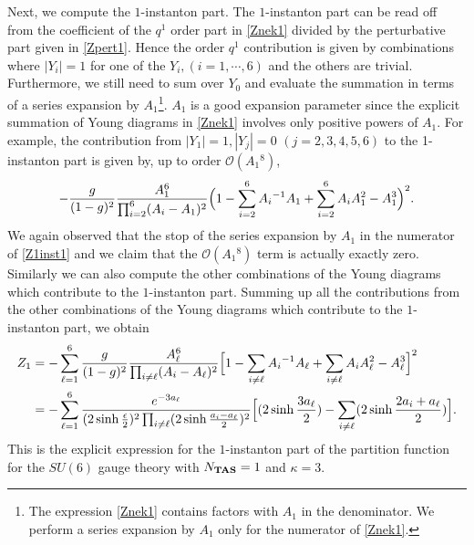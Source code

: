 \documentclass[11pt,a4paper]{article}
\newcommand{\nn}{\nonumber}
\begin{document}
Next, we compute the $1$-instanton part. The $1$-instanton part can be read off from the coefficient of the $q^1$ order part in \eqref{Znek1} divided by the perturbative part given in \eqref{Zpert1}.
Hence the order $q^1$ contribution is given by combinations where $|Y_i| = 1$ for one of the $Y_i, (i=1, \cdots, 6)$ and the others are trivial. Furthermore, we still need to sum over $Y_0$ and evaluate the summation in terms of a series expansion by $A_1$\footnote{The expression \eqref{Znek1} contains factors with $A_1$ in the denominator. We perform a series expansion by $A_1$ only for the numerator of \eqref{Znek1}. }. $A_1$ is a good expansion parameter since the explicit summation of Young diagrams in \eqref{Znek1} involves only positive powers of $A_1$. For example, the contribution from $|Y_1| = 1 , |Y_j| = 0 \,\, (j=2,3,4,5,6)$ to the 1-instanton part is given by, up to order $\mathcal{O} (A_1{}^8)$,
\begin{align}
 - \frac{g}{(1-g)^2} \frac{A_1^6}{\prod_{i= 2}^6 (A_i - A_1)^2} 
 \Bigl(
1 - \sum_{i = 2}^6  A_i{}^{-1} A_1 + \sum_{i = 2}^6  A_i A_1^2 - A_1^3
\Bigr)^2. \label{Z1inst1}
\end{align} 
We again observed that the stop of the series expansion by $A_1$ in the numerator of \eqref{Z1inst1} and we claim that the $\mathcal{O} (A_1{}^8)$ term is actually exactly zero. 
Similarly we can also compute the other combinations of the Young diagrams which contribute to the $1$-instanton part. Summing up all the contributions from the other combinations of the Young diagrams which contribute to the $1$-instanton part, we obtain
\begin{align}
Z_{1} 
&= - \sum_{\ell=1}^6
\frac{g}{(1-g)^2} \frac{A_\ell^6}{\prod_{i \neq \ell} (A_i - A_\ell)^2} 
\Bigl[
1 - \sum_{i \neq \ell}  A_i{}^{-1} A_\ell + \sum_{i \neq \ell}  A_i A_\ell^2 - A_\ell^3
\Bigr]^2
\nn\\
&= - \sum_{\ell=1}^6
\frac{e^{-3a_\ell}}{(2 \sinh \frac{\epsilon}{2} )^2\prod_{i \neq \ell} (2 \sinh \frac{a_i-a_\ell}{2})^2} 
\Bigl[ (2\sinh \frac{3 a_\ell}{2}) -
 \sum_{i \neq \ell}  (2\sinh \frac{2a_i +a_\ell}{2}) \Bigr].
\label{Zinst1}
\end{align}
This is the explicit expression for the $1$-instanton part of the partition function for the $SU(6)$ gauge theory with $N_{\bf TAS} = 1$ and $\kappa = 3$. 





\bigskip



%






\end{document}
